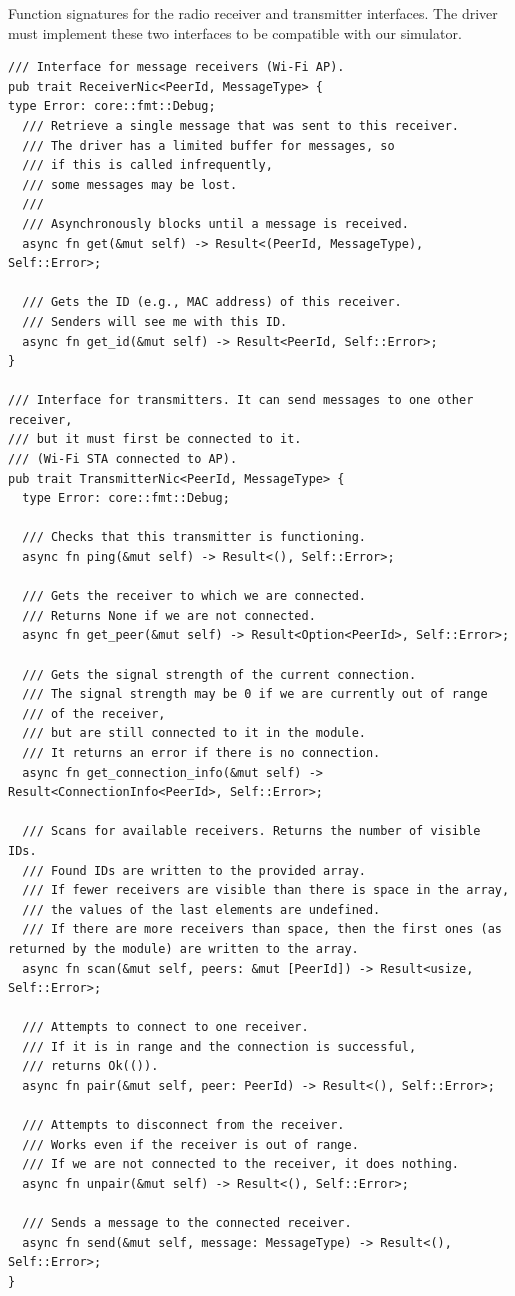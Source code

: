 \documentclass[%
]{article}
\begin{document}
\begin{listing}[h]
\caption{Function signatures for the radio receiver and transmitter interfaces. The driver must implement these two interfaces to be compatible with our simulator.}
\label{code:traits}
\begin{verbatim}
/// Interface for message receivers (Wi-Fi AP).
pub trait ReceiverNic<PeerId, MessageType> {
type Error: core::fmt::Debug;
  /// Retrieve a single message that was sent to this receiver.
  /// The driver has a limited buffer for messages, so
  /// if this is called infrequently,
  /// some messages may be lost.
  ///
  /// Asynchronously blocks until a message is received.
  async fn get(&mut self) -> Result<(PeerId, MessageType), Self::Error>;
  
  /// Gets the ID (e.g., MAC address) of this receiver.
  /// Senders will see me with this ID.
  async fn get_id(&mut self) -> Result<PeerId, Self::Error>;
}
  
/// Interface for transmitters. It can send messages to one other receiver,
/// but it must first be connected to it.
/// (Wi-Fi STA connected to AP).
pub trait TransmitterNic<PeerId, MessageType> {
  type Error: core::fmt::Debug;

  /// Checks that this transmitter is functioning.
  async fn ping(&mut self) -> Result<(), Self::Error>;

  /// Gets the receiver to which we are connected.
  /// Returns None if we are not connected.
  async fn get_peer(&mut self) -> Result<Option<PeerId>, Self::Error>;

  /// Gets the signal strength of the current connection.
  /// The signal strength may be 0 if we are currently out of range
  /// of the receiver,
  /// but are still connected to it in the module.
  /// It returns an error if there is no connection.
  async fn get_connection_info(&mut self) -> Result<ConnectionInfo<PeerId>, Self::Error>;

  /// Scans for available receivers. Returns the number of visible IDs.
  /// Found IDs are written to the provided array.
  /// If fewer receivers are visible than there is space in the array,
  /// the values of the last elements are undefined.
  /// If there are more receivers than space, then the first ones (as returned by the module) are written to the array.
  async fn scan(&mut self, peers: &mut [PeerId]) -> Result<usize, Self::Error>;
  
  /// Attempts to connect to one receiver.
  /// If it is in range and the connection is successful,
  /// returns Ok(()).
  async fn pair(&mut self, peer: PeerId) -> Result<(), Self::Error>;
  
  /// Attempts to disconnect from the receiver.
  /// Works even if the receiver is out of range.
  /// If we are not connected to the receiver, it does nothing.
  async fn unpair(&mut self) -> Result<(), Self::Error>;
  
  /// Sends a message to the connected receiver.
  async fn send(&mut self, message: MessageType) -> Result<(), Self::Error>;  
}
\end{verbatim}
\end{listing}
\end{document}
